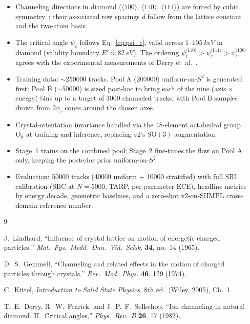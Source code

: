 \documentclass[11pt]{article}
\begin{document}
\begin{itemize}
  \item Channeling directions in diamond ($\langle 100\rangle$,
        $\langle 110\rangle$, $\langle 111\rangle$) are forced by cubic
        symmetry~\cite{Kittel}; their associated row spacings $d$ follow from
        the lattice constant and the two-atom basis.
  \item The critical angle $\psi_c$ follows Eq.~\eqref{eq:psi_c}, valid across
        $1$--$\SI{105}{keV}$ in diamond (validity boundary
        $E' \approx \SI{82}{eV}$). The ordering
        $\psi_c^{\langle 110\rangle} > \psi_c^{\langle 111\rangle} >
        \psi_c^{\langle 100\rangle}$ agrees with the experimental
        measurements of Derry et~al.~\cite{Derry1982}.
  \item Training data: $\sim$\num{250000} tracks. Pool A (\num{200000})
        uniform-on-$S^2$ is generated first; Pool B ($\sim$\num{50000}) is
        sized post-hoc to bring each of the nine
        (axis $\times$ energy) bins up to a target of \num{3000} channeled
        tracks, with Pool B samples drawn from $2\psi_c$ cones around the
        chosen axes.
  \item Crystal-orientation invariance handled via the 48-element octahedral
        group $\mathrm{O}_h$ at training and inference, replacing v2's
        $\mathrm{SO}(3)$ augmentation.
  \item Stage~1 trains on the combined pool; Stage~2 fine-tunes the flow on
        Pool A only, keeping the posterior prior uniform-on-$S^2$.
  \item Evaluation: \num{50000} tracks (\num{40000} uniform + \num{10000}
        stratified) with full SBI calibration (SBC at $N=5000$, TARP,
        per-parameter ECE), headline metrics by energy decade, geometric
        baselines, and a zero-shot v2-on-SIIMPL cross-domain reference number.
\end{itemize}

\begin{thebibliography}{9}

  J.~Lindhard,
  ``Influence of crystal lattice on motion of energetic charged particles,''
  \emph{Mat.\ Fys.\ Medd.\ Dan.\ Vid.\ Selsk.} \textbf{34}, no.~14 (1965).

  D.~S.~Gemmell,
  ``Channeling and related effects in the motion of charged particles through crystals,''
  \emph{Rev.\ Mod.\ Phys.} \textbf{46}, 129 (1974).

  C.~Kittel,
  \emph{Introduction to Solid State Physics}, 8th ed.\ (Wiley, 2005), Ch.~1.

  T.~E.~Derry, R.~W.~Fearick, and J.~P.~F.~Sellschop,
  ``Ion channeling in natural diamond. II.\ Critical angles,''
  \emph{Phys.\ Rev.\ B} \textbf{26}, 17 (1982).

\end{thebibliography}
\end{document}
